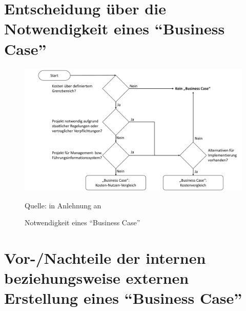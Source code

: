 \section{Entscheidung über die Notwendigkeit eines \enquote{Business Case}}

\begin{figure}[H]
	\centering
	\includegraphics[scale=0.48]{img/entscheidungBC.pdf}
	\caption{Notwendigkeit eines \enquote{Business Case}}
	{\footnotesize Quelle: in Anlehnung an \cite[][S.\,29]{brugger_it_2009}}
	\label{abb:entscheidungBC}
\end{figure}

\section{Vor-/Nachteile der internen beziehungsweise externen Erstellung eines \enquote{Business Case}}\label{appendixVorNachteileErstellungBC}

